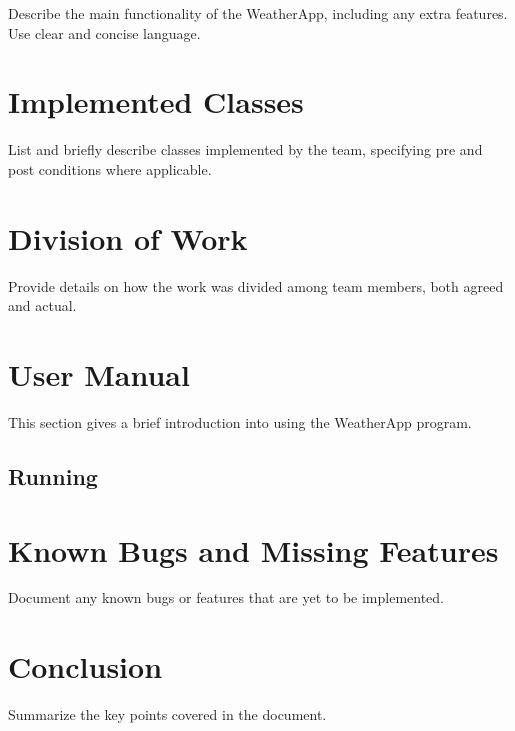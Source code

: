 \documentclass[a4paper,12pt]{article}
\begin{document}
Describe the main functionality of the WeatherApp, including any extra features. Use clear and concise language.

\section{Implemented Classes}

List and briefly describe classes implemented by the team, specifying pre and post conditions where applicable.

\section{Division of Work}

Provide details on how the work was divided among team members, both agreed and actual.

\section{User Manual}

This section gives a brief introduction into using the WeatherApp program.

\subsection{Running}


\section{Known Bugs and Missing Features}

Document any known bugs or features that are yet to be implemented.

\section{Conclusion}

Summarize the key points covered in the document.
\end{document}
